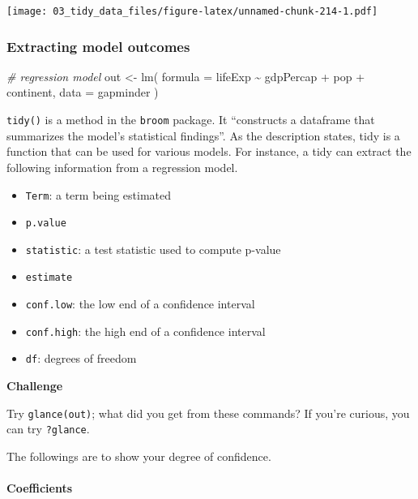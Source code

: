 \documentclass[
]{book}
\newenvironment{Shaded}{\begin{snugshade}}{\end{snugshade}}
\newcommand{\AttributeTok}[1]{\textcolor[rgb]{0.77,0.63,0.00}{#1}}
\newcommand{\CommentTok}[1]{\textcolor[rgb]{0.56,0.35,0.01}{\textit{#1}}}
\newcommand{\FunctionTok}[1]{\textcolor[rgb]{0.00,0.00,0.00}{#1}}
\newcommand{\NormalTok}[1]{#1}
\newcommand{\OtherTok}[1]{\textcolor[rgb]{0.56,0.35,0.01}{#1}}
\newcommand{\SpecialCharTok}[1]{\textcolor[rgb]{0.00,0.00,0.00}{#1}}
\providecommand{\tightlist}{%
  \setlength{\itemsep}{0pt}\setlength{\parskip}{0pt}}
\begin{document}
\texttt{[image: 03\_tidy\_data\_files/figure-latex/unnamed-chunk-214-1.pdf]}

\hypertarget{extracting-model-outcomes}{%
\subsubsection{Extracting model outcomes}\label{extracting-model-outcomes}}

\begin{Shaded}
\begin{Highlighting}[]
\CommentTok{\# regression model}
\NormalTok{out }\OtherTok{\textless{}{-}} \FunctionTok{lm}\NormalTok{(}
  \AttributeTok{formula =}\NormalTok{ lifeExp }\SpecialCharTok{\textasciitilde{}}\NormalTok{ gdpPercap }\SpecialCharTok{+}\NormalTok{ pop }\SpecialCharTok{+}\NormalTok{ continent,}
  \AttributeTok{data =}\NormalTok{ gapminder}
\NormalTok{)}
\end{Highlighting}
\end{Shaded}

\texttt{tidy()} is a method in the \texttt{broom} package. It ``constructs a dataframe that summarizes the model's statistical findings''. As the description states, tidy is a function that can be used for various models. For instance, a tidy can extract the following information from a regression model.

\begin{itemize}
\tightlist
\item
  \texttt{Term}: a term being estimated
\item
  \texttt{p.value}
\item
  \texttt{statistic}: a test statistic used to compute p-value
\item
  \texttt{estimate}
\item
  \texttt{conf.low}: the low end of a confidence interval
\item
  \texttt{conf.high}: the high end of a confidence interval
\item
  \texttt{df}: degrees of freedom
\end{itemize}

\textbf{Challenge}

Try \texttt{glance(out)}; what did you get from these commands? If you're curious, you can try \texttt{?glance}.

The followings are to show your degree of confidence.

\hypertarget{coefficients}{%
\paragraph{Coefficients}\label{coefficients}}
\end{document}
